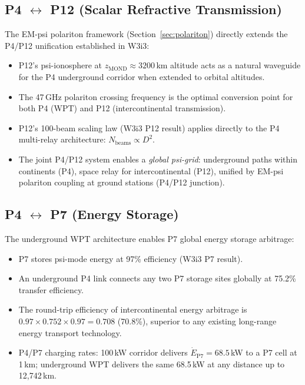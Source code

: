 \documentclass[aps,prd,twocolumn,superscriptaddress]{revtex4-2}
\begin{document}
\subsection{P4 $\leftrightarrow$ P12 (Scalar Refractive Transmission)}

The EM-psi polariton framework (Section~\ref{sec:polariton}) directly
extends the P4/P12 unification established in W3i3:
\begin{itemize}
\item P12's psi-ionosphere at $z_\mathrm{MOND} \approx 3200$\,km
  altitude acts as a natural waveguide for the P4 underground corridor
  when extended to orbital altitudes.
\item The 47\,GHz polariton crossing frequency is the optimal
  conversion point for both P4 (WPT) and P12 (intercontinental
  transmission).
\item P12's 100-beam scaling law (W3i3 P12 result) applies directly
  to the P4 multi-relay architecture: $N_\mathrm{beams} \propto D^2$.
\item The joint P4/P12 system enables a \emph{global psi-grid}:
  underground paths within continents (P4), space relay for
  intercontinental (P12), unified by EM-psi polariton coupling
  at ground stations (P4/P12 junction).
\end{itemize}

\subsection{P4 $\leftrightarrow$ P7 (Energy Storage)}

The underground WPT architecture enables P7 global energy storage
arbitrage:
\begin{itemize}
\item P7 stores psi-mode energy at 97\% efficiency (W3i3 P7 result).
\item An underground P4 link connects any two P7 storage sites
  globally at 75.2\% transfer efficiency.
\item The round-trip efficiency of intercontinental energy arbitrage
  is $0.97 \times 0.752 \times 0.97 = 0.708$ (70.8\%), superior to
  any existing long-range energy transport technology.
\item P4/P7 charging rates: 100\,kW corridor delivers
  $\dot{E}_\mathrm{P7} = 68.5$\,kW to a P7 cell at 1\,km;
  underground WPT delivers the same 68.5\,kW at any distance
  up to 12,742\,km.
\end{itemize}

\end{document}
